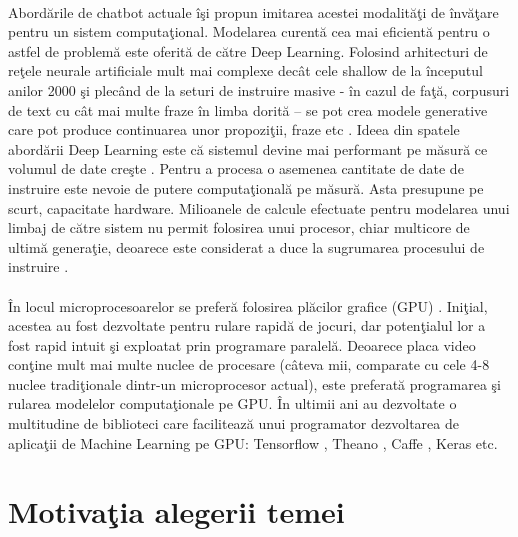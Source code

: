 \paragraph{}
Abord\u arile de chatbot actuale \^ i\c si propun imitarea acestei modalit\u a\c ti de \^ inv\u a\c tare pentru un sistem computa\c tional. Modelarea curent\u a cea mai eficient\u a pentru o astfel de problem\u a este oferit\u a de c\u atre Deep Learning. Folosind arhitecturi de re\c tele neurale artificiale mult mai complexe dec\^ at cele shallow de la \^ inceputul anilor 2000 \c si plec\^ and de la seturi de instruire masive - \^ in cazul de fa\c t\u a, corpusuri de text cu c\^ at mai multe fraze \^ in limba dorit\u a – se pot crea modele generative care pot produce continuarea unor propozi\c tii, fraze etc \cite{wildml-chatbots}. Ideea din spatele abord\u arii Deep Learning este c\u a sistemul devine mai performant pe m\u asur\u a ce volumul de date cre\c ste \cite{deep-learning-mode-data}. Pentru a procesa o asemenea cantitate de date de instruire este nevoie de putere computa\c tional\u a pe m\u asur\u a. Asta presupune pe scurt, capacitate hardware. Milioanele de calcule efectuate pentru modelarea unui limbaj de c\u atre sistem nu permit folosirea unui procesor, chiar multicore de ultim\u a genera\c tie, deoarece este considerat a duce la sugrumarea procesului de instruire \cite{cpu-failure}.

\paragraph{}
\^ In locul microprocesoarelor se prefer\u a folosirea pl\u acilor grafice (GPU) \cite{cpu-vs-gpu}. Ini\c tial, acestea au fost dezvoltate pentru rulare rapid\u a de jocuri, dar poten\c tialul lor a fost rapid intuit \c si exploatat prin programare paralel\u a. Deoarece placa video con\c tine mult mai multe nuclee de procesare (c\^ ateva mii, comparate cu cele 4-8 nuclee tradi\c tionale dintr-un microprocesor actual), este preferat\u a programarea \c si rularea modelelor computa\c tionale pe GPU. \^ In ultimii ani au dezvoltate o multitudine de biblioteci care faciliteaz\u a unui programator dezvoltarea de aplica\c tii de Machine Learning pe GPU: Tensorflow \cite{DBLP:journals/corr/AbadiABBCCCDDDG16}, Theano \cite{2016arXiv160502688short}, Caffe \cite{jia2014caffe}, Keras \cite{chollet2015keras} etc.

\section{Motiva\c tia alegerii temei}

